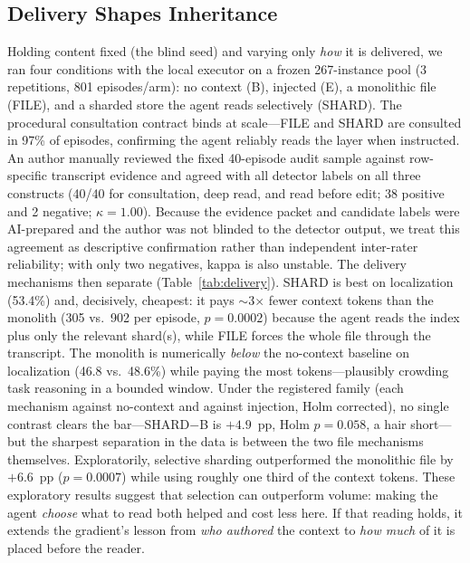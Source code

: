 \documentclass[sigconf,screen]{acmart}
\begin{document}
\subsection{Delivery Shapes Inheritance}\label{sec:delivery}
Holding content fixed (the blind seed) and varying only \emph{how} it is
delivered, we ran four conditions with the local executor on a frozen 267-instance
pool (3 repetitions, 801 episodes/arm): no context (B), injected (E), a monolithic
file (FILE), and a sharded store the agent reads selectively (SHARD). The
procedural consultation contract binds at scale---FILE and SHARD are consulted in
97\% of episodes, confirming the agent reliably reads the layer when instructed.
An author manually reviewed the fixed 40-episode audit sample against row-specific
transcript evidence and agreed with all detector labels on all three constructs
(40/40 for consultation, deep read, and read before edit; 38 positive and 2
negative; $\kappa=1.00$). Because the evidence packet and candidate labels were
AI-prepared and the author was not blinded to the detector output, we treat this
agreement as descriptive confirmation rather than independent inter-rater
reliability; with only two negatives, kappa is also unstable.
The delivery mechanisms then separate (Table~\ref{tab:delivery}). SHARD is best on
localization (53.4\%) and, decisively, cheapest: it pays $\sim$3$\times$ fewer
context tokens than the monolith (305 vs.\ 902 per episode, $p = 0.0002$) because the
agent reads the index plus only the relevant shard(s), while FILE forces the whole
file through the transcript. The monolith is numerically \emph{below} the
no-context baseline on localization (46.8 vs.\ 48.6\%) while paying the most
tokens---plausibly crowding task reasoning in a bounded window. Under the
registered family (each mechanism against no-context and against injection, Holm
corrected), no single contrast clears the bar---SHARD$-$B is $+4.9$~pp, Holm
$p = 0.058$, a hair short---but the sharpest separation in the data is between the
two file mechanisms themselves. Exploratorily, selective sharding outperformed the
monolithic file by $+6.6$~pp ($p = 0.0007$) while using roughly one third of the
context tokens. These exploratory results suggest that selection can outperform
volume: making the agent \emph{choose} what to read both helped and cost less
here. If that reading holds, it extends the gradient's lesson from \emph{who
authored} the context to \emph{how much} of it is placed before the reader.
\end{document}
